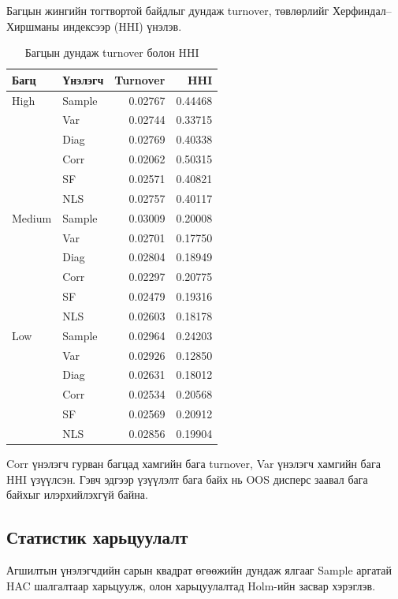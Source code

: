 Багцын жингийн тогтвортой байдлыг дундаж
turnover, төвлөрлийг Херфиндал--Хиршманы
индексээр (HHI) үнэлэв.

\begin{table}[htbp]
	\centering
	\caption{Багцын дундаж turnover болон HHI}
	\label{tab:weight_stability}
	\small
	\begin{tabular}{llrr}
		\hline
		Багц & Үнэлэгч & Turnover & HHI\\
		\hline
		High & Sample & 0.02767 & 0.44468\\
		& Var  & 0.02744 & 0.33715\\
		& Diag & 0.02769 & 0.40338\\
		& Corr & 0.02062 & 0.50315\\
		& SF   & 0.02571 & 0.40821\\
		& NLS  & 0.02757 & 0.40117\\
		\hline
		Medium & Sample & 0.03009 & 0.20008\\
		& Var  & 0.02701 & 0.17750\\
		& Diag & 0.02804 & 0.18949\\
		& Corr & 0.02297 & 0.20775\\
		& SF   & 0.02479 & 0.19316\\
		& NLS  & 0.02603 & 0.18178\\
		\hline
		Low & Sample & 0.02964 & 0.24203\\
		& Var  & 0.02926 & 0.12850\\
		& Diag & 0.02631 & 0.18012\\
		& Corr & 0.02534 & 0.20568\\
		& SF   & 0.02569 & 0.20912\\
		& NLS  & 0.02856 & 0.19904\\
		\hline
	\end{tabular}
\end{table}

Corr үнэлэгч гурван багцад хамгийн бага
turnover, Var үнэлэгч хамгийн бага HHI
үзүүлсэн. Гэвч эдгээр үзүүлэлт бага байх
нь OOS дисперс заавал бага байхыг
илэрхийлэхгүй байна.

\subsection{Статистик харьцуулалт}
\label{subsec:statistical_results}

Агшилтын үнэлэгчдийн сарын квадрат
өгөөжийн дундаж ялгааг Sample аргатай
HAC шалгалтаар харьцуулж, олон
харьцуулалтад Holm-ийн засвар хэрэглэв.

